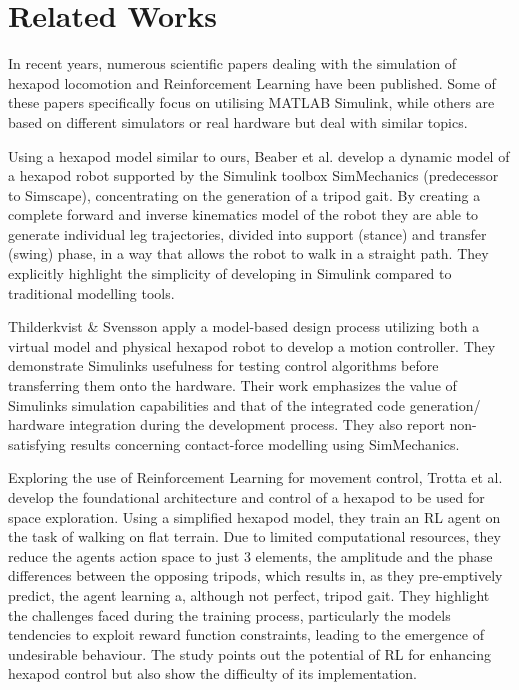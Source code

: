 \chapter{Related Works}
\label{ch:relatedWorks}

In recent years, numerous scientific papers dealing with the simulation of hexapod locomotion and Reinforcement Learning have been published.
Some of these papers specifically focus on utilising MATLAB Simulink, while others are based on different simulators or real hardware but deal with similar topics.

Using a hexapod model similar to ours, Beaber et al. \parencite{beaber2018dynamic} develop a dynamic model of a hexapod robot supported by the Simulink toolbox SimMechanics (predecessor to Simscape), concentrating on the generation of  a tripod gait.
By creating a complete forward and inverse kinematics model of the robot they are able to generate individual leg trajectories, divided into support (stance) and transfer (swing) phase, in a way that allows the robot to walk in a straight path.
They explicitly highlight the simplicity of developing in Simulink compared to traditional modelling tools.

Thilderkvist \& Svensson \Parencite{thilderkvist2015motion} apply a model-based design process utilizing both a virtual model and physical hexapod robot to develop a motion controller.
They demonstrate Simulinks usefulness for testing control algorithms before transferring them onto the hardware.
Their work emphasizes the value of Simulinks simulation capabilities and that of the integrated code generation/ hardware integration during the development process.
They also report non-satisfying results concerning contact-force modelling using SimMechanics.

Exploring the use of Reinforcement Learning for movement control, Trotta et al. \parencite{trotta2022walking} develop the foundational architecture and control of a hexapod to be used for space exploration.
Using a simplified hexapod model, they train an RL agent on the task of walking on flat terrain.
Due to limited computational resources, they reduce the agents action space to just 3 elements, the amplitude and the phase differences between the opposing tripods, which results in, as they pre-emptively predict, the agent learning a, although not perfect, tripod gait.
They highlight the challenges faced during the training process, particularly the models tendencies to exploit reward function constraints, leading to the emergence of undesirable behaviour.
The study points out the potential of RL for enhancing hexapod control but also show the difficulty of its implementation.
